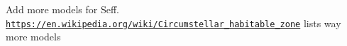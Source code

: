
\begin{DoxyRefList}
\item[\label{todo__todo000001}%
\Hypertarget{todo__todo000001}%
File \hyperlink{_circumstellar_habitable_zone_8hpp}{Circumstellar\+Habitable\+Zone.hpp} ]Add more models for Seff. \href{https://en.wikipedia.org/wiki/Circumstellar_habitable_zone}{\tt https\+://en.\+wikipedia.\+org/wiki/\+Circumstellar\+\_\+habitable\+\_\+zone} lists way more models 
\end{DoxyRefList}